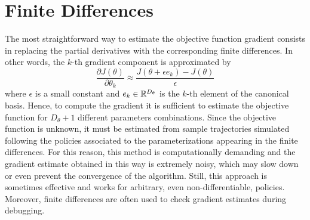 \section{Finite Differences}
The most straightforward way to estimate the objective function gradient consists in replacing the partial derivatives with the corresponding finite differences. In other words, the $k$-th gradient component is approximated by
\begin{equation}
	\frac{\partial J(\theta)}{\partial\theta_k} \approx \frac{J(\theta + \epsilon e_k) - J(\theta)}{\epsilon}
\end{equation}
where $\epsilon$ is a small constant and $e_k \in \mathbb{R}^{D_\theta}$ is the $k$-th element of the canonical basis. Hence, to compute the gradient it is sufficient to estimate the objective function for $D_\theta + 1$ different parameters combinations. Since the objective function is unknown, it must be estimated from sample trajectories simulated following the policies associated to the parameterizations appearing in the finite differences. For this reason, this method is computationally demanding and the gradient estimate obtained in this way is extremely noisy, which may slow down or even prevent the convergence of the algorithm. Still, this approach is sometimes effective and works for arbitrary, even non-differentiable, policies. Moreover, finite differences are often used to check gradient estimates during debugging.
